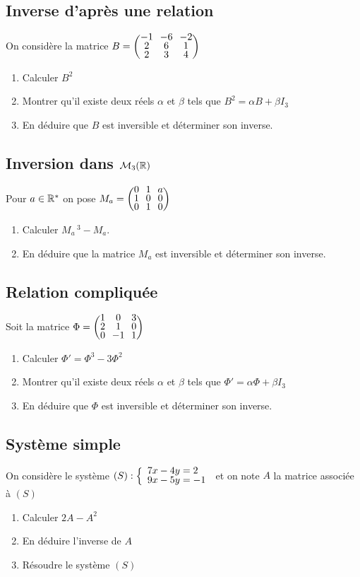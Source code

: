 \documentclass[oneside,12pt]{book}          %
\begin{document}
\subsection{Inverse d'après une relation}
On considère la matrice $B=\matrice{-1&-6&-2\\2&6&1\\2&3&4} $
    \begin{enumerate}
        \item Calculer $B^2$
        \item Montrer qu'il existe deux réels $\alpha$ et $\beta$ tels que $B^2=\alpha B+\beta I_3$
        \item En déduire que $B$ est inversible et déterminer son inverse.
    \end{enumerate}



\subsection{Inversion dans $\mathcal{M}_3({\mathbb R})$}
Pour $a\in{\mathbb R}^*$ on pose $M_a=\matrice{0&1&a\\1&0&0\\0&1&0}$
\begin{enumerate}
	\item Calculer $M_a\,^3-M_a$. 
	\item En déduire que la matrice $M_a$ est inversible et déterminer son inverse.
\end{enumerate}



\subsection{Relation compliquée}
Soit la matrice $\Phi=\matrice{1&0&3\\2&1&0\\0&-1&1} $
    \begin{enumerate}
        \item Calculer $\Phi'=\Phi^3-3\Phi^2$
        \item Montrer qu'il existe deux réels $\alpha$ et $\beta$ tels que $\Phi'=\alpha\Phi+\beta I_3$
        \item En déduire que $\Phi$ est inversible et déterminer son inverse.
    \end{enumerate}



\subsection{Système simple}
On considère le système $(S):\accol{7x-4y=2\\9x-5y=-1} $ et on note $A$ la matrice associée à $(S)$
    \begin{enumerate}
        \item Calculer $2A-A^2$
        \item En déduire l'inverse de $A$
        \item Résoudre le système $(S)$
    \end{enumerate}
    
\end{document}
